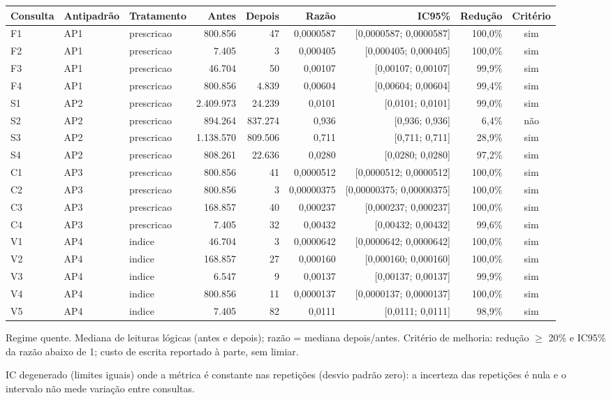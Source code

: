 {\small\setlength{\tabcolsep}{4pt}
\begin{tabular}{lllrrrrrc}
\toprule
Consulta & Antipadrão & Tratamento & Antes & Depois & Razão & IC95\% & Redução & Critério \\
\midrule
F1 & AP1 & prescricao & 800.856 & 47 & 0,0000587 & [0,0000587; 0,0000587] & 100,0\% & sim \\
F2 & AP1 & prescricao & 7.405 & 3 & 0,000405 & [0,000405; 0,000405] & 100,0\% & sim \\
F3 & AP1 & prescricao & 46.704 & 50 & 0,00107 & [0,00107; 0,00107] & 99,9\% & sim \\
F4 & AP1 & prescricao & 800.856 & 4.839 & 0,00604 & [0,00604; 0,00604] & 99,4\% & sim \\
S1 & AP2 & prescricao & 2.409.973 & 24.239 & 0,0101 & [0,0101; 0,0101] & 99,0\% & sim \\
S2 & AP2 & prescricao & 894.264 & 837.274 & 0,936 & [0,936; 0,936] & 6,4\% & não \\
S3 & AP2 & prescricao & 1.138.570 & 809.506 & 0,711 & [0,711; 0,711] & 28,9\% & sim \\
S4 & AP2 & prescricao & 808.261 & 22.636 & 0,0280 & [0,0280; 0,0280] & 97,2\% & sim \\
C1 & AP3 & prescricao & 800.856 & 41 & 0,0000512 & [0,0000512; 0,0000512] & 100,0\% & sim \\
C2 & AP3 & prescricao & 800.856 & 3 & 0,00000375 & [0,00000375; 0,00000375] & 100,0\% & sim \\
C3 & AP3 & prescricao & 168.857 & 40 & 0,000237 & [0,000237; 0,000237] & 100,0\% & sim \\
C4 & AP3 & prescricao & 7.405 & 32 & 0,00432 & [0,00432; 0,00432] & 99,6\% & sim \\
V1 & AP4 & indice & 46.704 & 3 & 0,0000642 & [0,0000642; 0,0000642] & 100,0\% & sim \\
V2 & AP4 & indice & 168.857 & 27 & 0,000160 & [0,000160; 0,000160] & 100,0\% & sim \\
V3 & AP4 & indice & 6.547 & 9 & 0,00137 & [0,00137; 0,00137] & 99,9\% & sim \\
V4 & AP4 & indice & 800.856 & 11 & 0,0000137 & [0,0000137; 0,0000137] & 100,0\% & sim \\
V5 & AP4 & indice & 7.405 & 82 & 0,0111 & [0,0111; 0,0111] & 98,9\% & sim \\
\bottomrule
\end{tabular}\par
\vspace{3pt}
\begin{minipage}{\linewidth}\footnotesize
Regime quente. Mediana de leituras lógicas (antes e depois); razão = mediana depois/antes. Critério de melhoria: redução $\geq$ 20\% e IC95\% da razão abaixo de 1; custo de escrita reportado à parte, sem limiar.\par
IC degenerado (limites iguais) onde a métrica é constante nas repetições (desvio padrão zero): a incerteza das repetições é nula e o intervalo não mede variação entre consultas.
\end{minipage}
}
